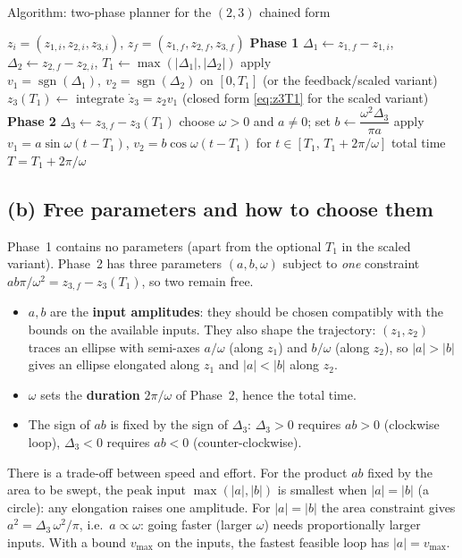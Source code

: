 \documentclass[11pt,a4paper]{article}
\def\boldsymbol#1{#1}%
\DeclareMathOperator{\sgn}{sgn}
\newcommand{\z}{\boldsymbol{z}}
\theoremstyle{definition}
\theoremstyle{plain}
\theoremstyle{remark}
\begin{document}
\begin{algbox}{Algorithm: two-phase planner for the $(2,3)$ chained form}
\begin{algorithmic}[1]
  \Require $\z_i=(z_{1,i},z_{2,i},z_{3,i})$, $\z_f=(z_{1,f},z_{2,f},z_{3,f})$
  \Statex \textbf{Phase 1}
  \State $\Delta_1\gets z_{1,f}-z_{1,i}$, $\Delta_2\gets z_{2,f}-z_{2,i}$, \; $T_1\gets\max(|\Delta_1|,|\Delta_2|)$ 
  \State apply $v_1=\sgn(\Delta_1),\ v_2=\sgn(\Delta_2)$ on $[0,T_1]$ (or the feedback/scaled variant)
  \State $z_3(T_1)\gets$ integrate $\dot z_3=z_2v_1$ (closed form \eqref{eq:z3T1} for the scaled variant)
  \Statex \textbf{Phase 2}
  \State $\Delta_3\gets z_{3,f}-z_3(T_1)$
  \State choose $\omega>0$ and $a\ne0$; set $b\gets \dfrac{\omega^2\Delta_3}{\pi a}$ 
  \State apply $v_1=a\sin\omega(t-T_1)$, $v_2=b\cos\omega(t-T_1)$ for $t\in[T_1,\,T_1+2\pi/\omega]$
  \State \Return total time $T=T_1+2\pi/\omega$
\end{algorithmic}
\end{algbox}

\subsection{(b) Free parameters and how to choose them}

Phase~1 contains no parameters (apart from the optional $T_1$ in the scaled variant). Phase~2 has three parameters $(a,b,\omega)$ subject to \emph{one} constraint $ab\pi/\omega^2=z_{3,f}-z_3(T_1)$, so two remain free.
\begin{itemize}[nosep]
  \item $a,b$ are the \textbf{input amplitudes}: they should be chosen compatibly with the bounds on the available inputs. They also shape the trajectory: $(z_1,z_2)$ traces an ellipse with semi-axes $a/\omega$ (along $z_1$) and $b/\omega$ (along $z_2$), so $|a|>|b|$ gives an ellipse elongated along $z_1$ and $|a|<|b|$ along $z_2$.
  \item $\omega$ sets the \textbf{duration} $2\pi/\omega$ of Phase~2, hence the total time.
  \item The sign of $ab$ is fixed by the sign of $\Delta_3$: $\Delta_3>0$ requires $ab>0$ (clockwise loop), $\Delta_3<0$ requires $ab<0$ (counter-clockwise).
\end{itemize}

\begin{intuition}
There is a trade-off between speed and effort. For the product $ab$ fixed by the area to be swept, the peak input $\max(|a|,|b|)$ is smallest when $|a|=|b|$ (a circle): any elongation raises one amplitude. For $|a|=|b|$ the area constraint gives $a^2=\Delta_3\,\omega^2/\pi$, i.e.\ $a\propto\omega$: going faster (larger $\omega$) needs proportionally larger inputs. With a bound $v_{\max}$ on the inputs, the fastest feasible loop has $|a|=v_{\max}$.
\end{intuition}
\end{document}
